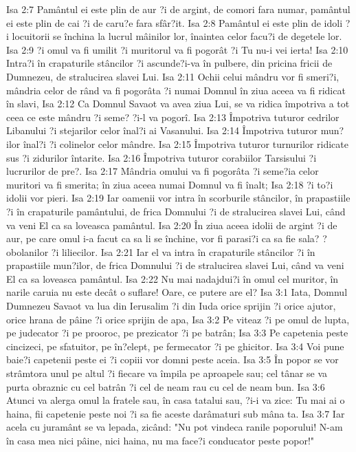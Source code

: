 Isa 2:7  Pamântul ei este plin de aur ?i de argint, de comori fara numar, pamântul ei este plin de cai ?i de caru?e fara sfâr?it.
Isa 2:8  Pamântul ei este plin de idoli ?i locuitorii se închina la lucrul mâinilor lor, înaintea celor facu?i de degetele lor.
Isa 2:9  ?i omul va fi umilit ?i muritorul va fi pogorât ?i Tu nu-i vei ierta!
Isa 2:10  Intra?i în crapaturile stâncilor ?i ascunde?i-va în pulbere, din pricina fricii de Dumnezeu, de stralucirea slavei Lui.
Isa 2:11  Ochii celui mândru vor fi smeri?i, mândria celor de rând va fi pogorâta ?i numai Domnul în ziua aceea va fi ridicat în slavi,
Isa 2:12  Ca Domnul Savaot va avea ziua Lui, se va ridica împotriva a tot ceea ce este mândru ?i seme? ?i-l va pogorî.
Isa 2:13  Împotriva tuturor cedrilor Libanului ?i stejarilor celor înal?i ai Vasanului.
Isa 2:14  Împotriva tuturor mun?ilor înal?i ?i colinelor celor mândre.
Isa 2:15  Împotriva tuturor turnurilor ridicate sus ?i zidurilor întarite.
Isa 2:16  Împotriva tuturor corabiilor Tarsisului ?i lucrurilor de pre?.
Isa 2:17  Mândria omului va fi pogorâta ?i seme?ia celor muritori va fi smerita; în ziua aceea numai Domnul va fi înalt;
Isa 2:18  ?i to?i idolii vor pieri.
Isa 2:19  Iar oamenii vor intra în scorburile stâncilor, în prapastiile ?i în crapaturile pamântului, de frica Domnului ?i de stralucirea slavei Lui, când va veni El ca sa loveasca pamântul.
Isa 2:20  În ziua aceea idolii de argint ?i de aur, pe care omul i-a facut ca sa li se închine, vor fi parasi?i ca sa fie sala? ?obolanilor ?i liliecilor.
Isa 2:21  Iar el va intra în crapaturile stâncilor ?i în prapastiile mun?ilor, de frica Domnului ?i de stralucirea slavei Lui, când va veni El ca sa loveasca pamântul.
Isa 2:22  Nu mai nadajdui?i în omul cel muritor, în narile caruia nu este decât o suflare! Oare, ce putere are el?
Isa 3:1  Iata, Domnul Dumnezeu Savaot va lua din Ierusalim ?i din Iuda orice sprijin ?i orice ajutor, orice hrana de pâine ?i orice sprijin de apa,
Isa 3:2  Pe viteaz ?i pe omul de lupta, pe judecator ?i pe prooroc, pe prezicator ?i pe batrân;
Isa 3:3  Pe capetenia peste cincizeci, pe sfatuitor, pe în?elept, pe fermecator ?i pe ghicitor.
Isa 3:4  Voi pune baie?i capetenii peste ei ?i copiii vor domni peste aceia.
Isa 3:5  În popor se vor strâmtora unul pe altul ?i fiecare va împila pe aproapele sau; cel tânar se va purta obraznic cu cel batrân ?i cel de neam rau cu cel de neam bun.
Isa 3:6  Atunci va alerga omul la fratele sau, în casa tatalui sau, ?i-i va zice: Tu mai ai o haina, fii capetenie peste noi ?i sa fie aceste darâmaturi sub mâna ta.
Isa 3:7  Iar acela cu juramânt se va lepada, zicând: "Nu pot vindeca ranile poporului! N-am în casa mea nici pâine, nici haina, nu ma face?i conducator peste popor!"
